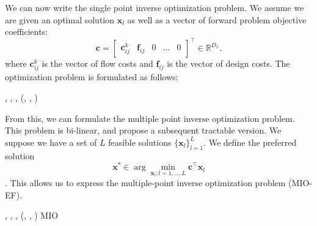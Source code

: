 We can now write the single point inverse optimization problem. We assume we are given an optimal solution $\bm{x}_l$ as well as a vector of forward problem objective coefficients:
\begin{equation}
    \bm{c} = \begin{bmatrix}
    \bm{c}_{ij}^k & \bm{f}_{ij} & 0 & \ldots & 0
\end{bmatrix}^\top \in \mathbb{R}^{D_x}.
\end{equation}
where $\bm{c}_{ij}^k$ is the vector of flow costs and $ \bm{f}_{ij} $ is the vector of design costs. The optimization problem is formulated as follows:

\begin{minie}[2]
    {, , \bm{\pi}, \bm{\rho}}
    {(, , )}
    {}
    {}
\end{minie}

From this, we can formulate the multiple point inverse optimization problem. This problem is bi-linear, and \cite{ghobadiInferringLinearFeasible2021} propose a subsequent tractable version. We suppose we have a set of $L$ feasible solutions $\{\bm{x}_l\}^L_{l=1}$. We define the preferred solution 
$$\bm{x}^* \in \arg \min_{\bm{x}_l : l = 1, \ldots, L} \bm{c}^\top \bm{x}_l$$. This allows us to express the multiple-point inverse optimization problem (MIO-EF). 

\begin{minie}[2]
    {, , \bm{\pi}, \bm{\rho}}
    {(, , )}
    {MIO}
    {}
\end{minie}

